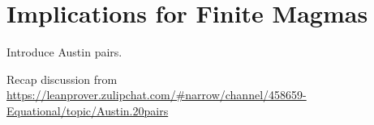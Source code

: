 \section{Implications for Finite Magmas}\label{austin-sec}


Introduce Austin pairs.

Recap discussion from \url{https://leanprover.zulipchat.com/#narrow/channel/458659-Equational/topic/Austin.20pairs}
